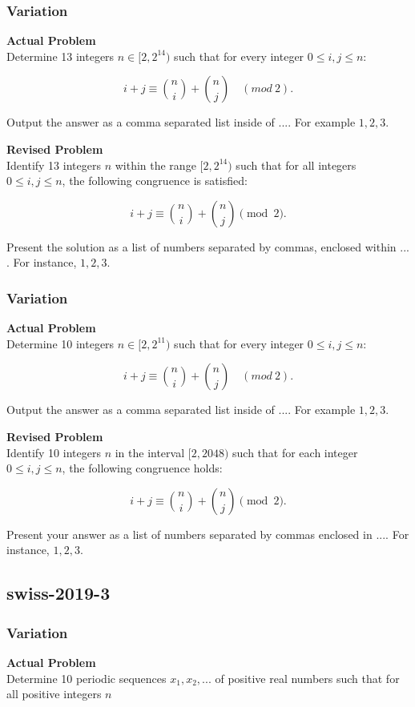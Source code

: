 \subsubsection{Variation}
\textbf{Actual Problem}\\
Determine 13 integers $n \in [2, 2^{14})$ such that for every integer $0 \leq i,j \leq n$:

$$i + j \equiv \binom{n}{i} + \binom{n}{j} \quad (mod~2).$$

Output the answer as a comma separated list inside of $\boxed{...}$. For example $\boxed{1, 2, 3}$.

\textbf{Revised Problem}\\
Identify 13 integers $n$ within the range $[2, 2^{14})$ such that for all integers $0 \leq i,j \leq n$, the following congruence is satisfied:

$$i + j \equiv \binom{n}{i} + \binom{n}{j} \pmod{2}.$$

Present the solution as a list of numbers separated by commas, enclosed within $\boxed{...}$. For instance, $\boxed{1, 2, 3}$.

\subsubsection{Variation}
\textbf{Actual Problem}\\
Determine 10 integers $n \in [2, 2^{11})$ such that for every integer $0 \leq i,j \leq n$:

$$i + j \equiv \binom{n}{i} + \binom{n}{j} \quad (mod~2).$$

Output the answer as a comma separated list inside of $\boxed{...}$. For example $\boxed{1, 2, 3}$.

\textbf{Revised Problem}\\
Identify 10 integers \( n \) in the interval \([2, 2048)\) such that for each integer \( 0 \leq i, j \leq n \), the following congruence holds:

\[ 
i + j \equiv \binom{n}{i} + \binom{n}{j} \pmod{2}.
\]

Present your answer as a list of numbers separated by commas enclosed in \(\boxed{...}\). For instance, \(\boxed{1, 2, 3}\).

\subsection{swiss-2019-3}
\subsubsection{Variation}
\textbf{Actual Problem}\\
Determine 10 periodic sequences $x_1, x_2, ...$ of positive real numbers such that for all positive integers $n$

